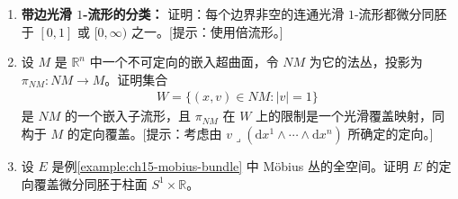 \documentclass[../../main.tex]{subfiles}
\begin{document}
\begin{enumerate}
\item\label{exercise:ch15-14b} \textbf{带边光滑 $1$-流形的分类：} 证明：每个边界非空的连通光滑 $1$-流形都微分同胚于 $[0,1]$ 或 $[0,\infty)$ 之一。[提示：使用倍流形。]

\item\label{exercise:ch15-15} 设 $M$ 是 $\mathbb{R}^n$ 中一个不可定向的嵌入超曲面，令 $NM$ 为它的法丛，投影为 $\pi_{NM}:NM\to M$。证明集合
\begin{align*}
W=\{(x,v)\in NM:|v|=1\}
\end{align*}
是 $NM$ 的一个嵌入子流形，且 $\pi_{NM}$ 在 $W$ 上的限制是一个光滑覆盖映射，同构于 $M$ 的定向覆盖。[提示：考虑由 $v\lrcorner(\mathrm{d}x^1\wedge\cdots\wedge\mathrm{d}x^n)$ 所确定的定向。]

\item\label{exercise:ch15-16b} 设 $E$ 是例\ref{example:ch15-mobius-bundle} 中 Möbius 丛的全空间。证明 $E$ 的定向覆盖微分同胚于柱面 $S^1\times\mathbb{R}$。
\end{enumerate}
\end{document}
